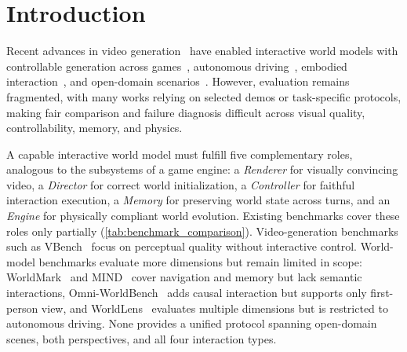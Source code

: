 \documentclass{llmxive}
\begin{document}
\section{Introduction}
\label{sec:introduction}

Recent advances in video generation~\cite{ho2020denoising,kong2024hunyuanvideo,wan2025wan,polyak2024moviegen,brooks2024sora} have enabled interactive world models with controllable generation across games~\cite{bruce2024genie,deepmind2024genie2,ball2025genie3,he2025matrixgame2,he2026matrixgame3,li2025hunyuangamecraft,tang2025interbench}, autonomous driving~\cite{hu2023gaia1,gao2024vista}, embodied interaction~\cite{yang2023unisim,zhu2024irasim}, and open-domain scenarios~\cite{sun2025hyworldplay,chen2025yume,mao2025yume15,gao2026lingbot}.
However, evaluation remains fragmented, with many works relying on selected demos or task-specific protocols, making fair comparison and failure diagnosis difficult across visual quality, controllability, memory, and physics.

A capable interactive world model must fulfill five complementary roles, analogous to the subsystems of a game engine: a \emph{Renderer} for visually convincing video, a \emph{Director} for correct world initialization, a \emph{Controller} for faithful interaction execution, a \emph{Memory} for preserving world state across turns, and an \emph{Engine} for physically compliant world evolution. Existing benchmarks cover these roles only partially (\cref{tab:benchmark_comparison}). Video-generation benchmarks such as VBench~\cite{huang2024vbench,zheng2025vbench2} focus on perceptual quality without interactive control. World-model benchmarks evaluate more dimensions but remain limited in scope: WorldMark~\cite{xu2026worldmark} and MIND~\cite{ye2026mind} cover navigation and memory but lack semantic interactions, Omni-WorldBench~\cite{wu2026omniworldbench} adds causal interaction but supports only first-person view, and WorldLens~\cite{worldlens2025} evaluates multiple dimensions but is restricted to autonomous driving. None provides a unified protocol spanning open-domain scenes, both perspectives, and all four interaction types.
\end{document}
